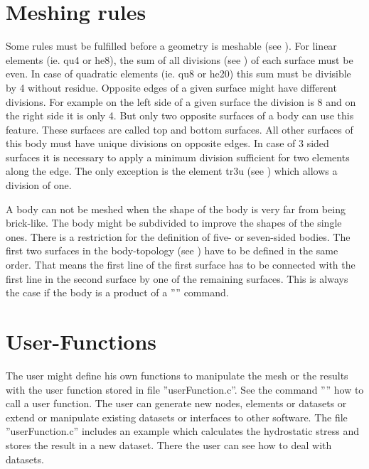 \documentclass{article}
\begin{document}
 \section{\label{Meshing rules}Meshing rules}
Some rules must be fulfilled before a geometry is meshable (see ). For linear elements (ie. qu4 or he8), the sum of all divisions (see ) of each surface must be even. In case of quadratic elements (ie. qu8 or he20) this sum must be divisible by 4 without residue. Opposite edges of a given surface might have different divisions. For example on the left side of a given surface the division is 8 and on the right side it is only 4. But only two opposite surfaces of a body can use this feature. These surfaces are called top and bottom surfaces. All other surfaces of this body must have unique divisions on opposite edges. In case of 3 sided surfaces it is necessary to apply a minimum division sufficient for two elements along the edge. The only exception is the element tr3u (see ) which allows a division of one.

A body can not be meshed when the shape of the body is very far from being brick-like. The body might be subdivided to improve the shapes of the single ones. There is a restriction for the definition of five- or seven-sided bodies. The first two surfaces in the body-topology (see ) have to be defined in the same order. That means the first line of the first surface has to be connected with the first line in the second surface by one of the remaining surfaces. This is always the case if the body is a product of a '''' command.

 \section{\label{User-Functions}User-Functions}
The user might define his own functions to manipulate the mesh or the results with the user function stored in file ''userFunction.c''. See the command '''' how to call a user function. The user can generate new nodes, elements or datasets or extend or manipulate existing datasets or interfaces to other software. The file ''userFunction.c'' includes an example which calculates the hydrostatic stress and stores the result in a new dataset. There the user can see how to deal with datasets.
\end{document}
